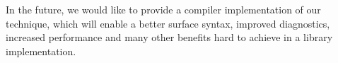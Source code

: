 
In the future, we would like to provide a compiler implementation of our 
technique, which will enable a better surface syntax, improved diagnostics, 
increased performance and many other benefits hard to achieve in a library 
implementation.

%
%
%
%
%